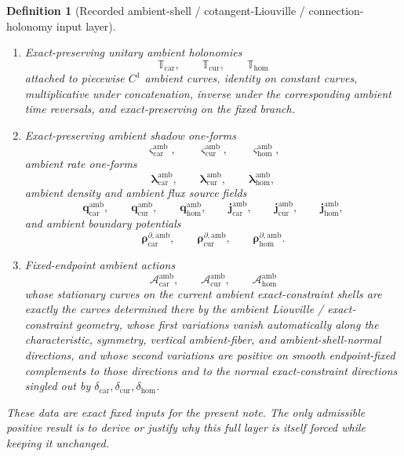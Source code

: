 \documentclass[11pt]{article}
\newcommand{\TensorConstraintGap}{\delta_{\mathrm{car}}}
\newcommand{\CurConstraintGap}{\delta_{\mathrm{cur}}}
\newcommand{\HomConstraintGap}{\delta_{\mathrm{hom}}}
\newcommand{\TensorConfigSpace}{\mathcal Q_{\mathrm{car}}}
\newcommand{\CurConfigSpace}{\mathcal Q_{\mathrm{cur}}}
\newcommand{\HomConfigSpace}{\mathcal Q_{\mathrm{hom}}}
\newcommand{\HomCotangentRealization}{\Psi_{\mathrm{hom}}}
\newcommand{\TensorAmbientLiouville}{\boldsymbol{\Lambda}_{\mathrm{car}}}
\newcommand{\CurAmbientLiouville}{\boldsymbol{\Lambda}_{\mathrm{cur}}}
\newcommand{\HomAmbientLiouville}{\boldsymbol{\Lambda}_{\mathrm{hom}}}
\newcommand{\TensorAmbientTwo}{\boldsymbol{\Xi}_{\mathrm{car}}}
\newcommand{\CurAmbientTwo}{\boldsymbol{\Xi}_{\mathrm{cur}}}
\newcommand{\HomAmbientTwo}{\boldsymbol{\Xi}_{\mathrm{hom}}}
\newcommand{\TensorAmbientTransport}{\mathbb T_{\mathrm{car}}}
\newcommand{\CurAmbientTransport}{\mathbb T_{\mathrm{cur}}}
\newcommand{\HomAmbientTransport}{\mathbb T_{\mathrm{hom}}}
\newcommand{\TensorAmbientShadowForm}{\boldsymbol{\varsigma}_{\mathrm{car}}^{\mathrm{amb}}}
\newcommand{\CurAmbientShadowForm}{\boldsymbol{\varsigma}_{\mathrm{cur}}^{\mathrm{amb}}}
\newcommand{\HomAmbientShadowForm}{\boldsymbol{\varsigma}_{\mathrm{hom}}^{\mathrm{amb}}}
\newcommand{\TensorAmbientRateForm}{\boldsymbol{\lambda}_{\mathrm{car}}^{\mathrm{amb}}}
\newcommand{\CurAmbientRateForm}{\boldsymbol{\lambda}_{\mathrm{cur}}^{\mathrm{amb}}}
\newcommand{\HomAmbientRateForm}{\boldsymbol{\lambda}_{\mathrm{hom}}^{\mathrm{amb}}}
\newcommand{\TensorAmbientDensitySource}{\boldsymbol{q}_{\mathrm{car}}^{\mathrm{amb}}}
\newcommand{\CurAmbientDensitySource}{\boldsymbol{q}_{\mathrm{cur}}^{\mathrm{amb}}}
\newcommand{\HomAmbientDensitySource}{\boldsymbol{q}_{\mathrm{hom}}^{\mathrm{amb}}}
\newcommand{\TensorAmbientFluxSource}{\boldsymbol{j}_{\mathrm{car}}^{\mathrm{amb}}}
\newcommand{\CurAmbientFluxSource}{\boldsymbol{j}_{\mathrm{cur}}^{\mathrm{amb}}}
\newcommand{\HomAmbientFluxSource}{\boldsymbol{j}_{\mathrm{hom}}^{\mathrm{amb}}}
\newcommand{\TensorAmbientBoundarySource}{\boldsymbol{\rho}_{\mathrm{car}}^{\partial,\mathrm{amb}}}
\newcommand{\CurAmbientBoundarySource}{\boldsymbol{\rho}_{\mathrm{cur}}^{\partial,\mathrm{amb}}}
\newcommand{\HomAmbientBoundarySource}{\boldsymbol{\rho}_{\mathrm{hom}}^{\partial,\mathrm{amb}}}
\newcommand{\TensorAmbientAction}{\mathscr A_{\mathrm{car}}^{\mathrm{amb}}}
\newcommand{\CurAmbientAction}{\mathscr A_{\mathrm{cur}}^{\mathrm{amb}}}
\newcommand{\HomAmbientAction}{\mathscr A_{\mathrm{hom}}^{\mathrm{amb}}}
\newtheorem{definition}{Definition}
\begin{document}
\begin{definition}[Recorded ambient-shell / cotangent-Liouville / connection-holonomy input layer]
\begin{enumerate}
\[    \HomCotangentRealization
    \]
    into the cotangent bundles of the configuration spaces \(\TensorConfigSpace,\CurConfigSpace,\HomConfigSpace\), producing the ambient Liouville one-forms
    \[
    \TensorAmbientLiouville,\qquad
    \CurAmbientLiouville,\qquad
    \HomAmbientLiouville
    \]
    and the closed ambient two-forms
    \[
    \TensorAmbientTwo,\qquad
    \CurAmbientTwo,\qquad
    \HomAmbientTwo.
    \]
    \item Exact-preserving unitary ambient holonomies
    \[
    \TensorAmbientTransport,\qquad
    \CurAmbientTransport,\qquad
    \HomAmbientTransport
    \]
    attached to piecewise \(C^1\) ambient curves, identity on constant curves, multiplicative under concatenation, inverse under the corresponding ambient time reversals, and exact-preserving on the fixed branch.
    \item Exact-preserving ambient shadow one-forms
    \[
    \TensorAmbientShadowForm,\qquad
    \CurAmbientShadowForm,\qquad
    \HomAmbientShadowForm,
    \]
    ambient rate one-forms
    \[
    \TensorAmbientRateForm,\qquad
    \CurAmbientRateForm,\qquad
    \HomAmbientRateForm,
    \]
    ambient density and ambient flux source fields
    \[
    \TensorAmbientDensitySource,\qquad
    \CurAmbientDensitySource,\qquad
    \HomAmbientDensitySource,\qquad
    \TensorAmbientFluxSource,\qquad
    \CurAmbientFluxSource,\qquad
    \HomAmbientFluxSource,
    \]
    and ambient boundary potentials
    \[
    \TensorAmbientBoundarySource,\qquad
    \CurAmbientBoundarySource,\qquad
    \HomAmbientBoundarySource.
    \]
    \item Fixed-endpoint ambient actions
    \[
    \TensorAmbientAction,\qquad
    \CurAmbientAction,\qquad
    \HomAmbientAction
    \]
    whose stationary curves on the current ambient exact-constraint shells are exactly the curves determined there by the ambient Liouville / exact-constraint geometry, whose first variations vanish automatically along the characteristic, symmetry, vertical ambient-fiber, and ambient-shell-normal directions, and whose second variations are positive on smooth endpoint-fixed complements to those directions and to the normal exact-constraint directions singled out by \(\TensorConstraintGap,\CurConstraintGap,\HomConstraintGap\).
\end{enumerate}
These data are exact fixed inputs for the present note. The only admissible positive result is to derive or justify why this full layer is itself forced while keeping it unchanged.
\end{definition}
\end{document}
